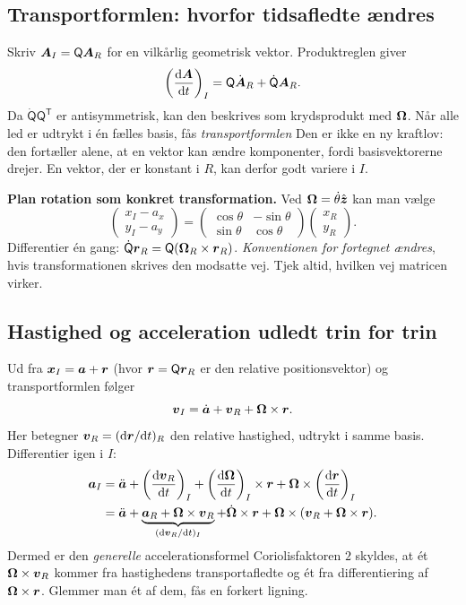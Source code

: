 \subsection{Transportformlen: hvorfor tidsafledte ændres}
Skriv $\boldsymbol{A}_I=\mathsf Q\boldsymbol{A}_R$ for en vilkårlig geometrisk vektor. Produktreglen giver
\[
\left(\frac{\mathrm d\boldsymbol{A}}{\mathrm d t}\right)_I
=\mathsf Q\dot{\boldsymbol{A}}_R+\dot{\mathsf Q}\boldsymbol{A}_R.
\]
Da $\dot{\mathsf Q}\mathsf Q^{\mathsf T}$ er antisymmetrisk, kan den beskrives som krydsprodukt med $\boldsymbol{\Omega}$. Når alle led er udtrykt i én fælles basis, fås \emph{transportformlen}
Den er ikke en ny kraftlov: den fortæller alene, at en vektor kan ændre komponenter, fordi basisvektorerne drejer. En vektor, der er konstant i $R$, kan derfor godt variere i $I$.

\textbf{Plan rotation som konkret transformation.} Ved $\boldsymbol{\Omega}=\dot\theta\hat{\boldsymbol{z}}$ kan man vælge
\[
\begin{pmatrix}x_I-a_x\\y_I-a_y\end{pmatrix}
=\begin{pmatrix}\cos\theta&-\sin\theta\\\sin\theta&\cos\theta\end{pmatrix}
\begin{pmatrix}x_R\\y_R\end{pmatrix}.
\]
Differentier én gang: $\dot{\mathsf Q}\boldsymbol{r}_R=\mathsf Q(\boldsymbol{\Omega}_R\times\boldsymbol{r}_R)$. \emph{Konventionen for fortegnet ændres}, hvis transformationen skrives den modsatte vej. Tjek altid, hvilken vej matricen virker.

\subsection{Hastighed og acceleration udledt trin for trin}
Ud fra $\boldsymbol{x}_I=\boldsymbol{a}+\boldsymbol{r}$ (hvor $\boldsymbol{r}=\mathsf Q\boldsymbol{r}_R$ er den relative positionsvektor) og transportformlen følger
\[
\boldsymbol{v}_I=\dot{\boldsymbol{a}}+\boldsymbol{v}_R+\boldsymbol{\Omega}\times\boldsymbol{r}.
\]
Her betegner $\boldsymbol{v}_R=(\mathrm d\boldsymbol{r}/\mathrm d t)_R$ den relative hastighed, udtrykt i samme basis. Differentier igen i $I$:
\begin{align*}
\boldsymbol{a}_I
&=\ddot{\boldsymbol{a}}
+\left(\frac{\mathrm d\boldsymbol{v}_R}{\mathrm d t}\right)_I
+\left(\frac{\mathrm d\boldsymbol{\Omega}}{\mathrm d t}\right)_I\times\boldsymbol{r}
+\boldsymbol{\Omega}\times\left(\frac{\mathrm d\boldsymbol{r}}{\mathrm d t}\right)_I\\
&=\ddot{\boldsymbol{a}}
+\underbrace{\boldsymbol{a}_R+\boldsymbol{\Omega}\times\boldsymbol{v}_R}_{(\mathrm d\boldsymbol{v}_R/\mathrm d t)_I}
+\dot{\boldsymbol{\Omega}}\times\boldsymbol{r}
+\boldsymbol{\Omega}\times(\boldsymbol{v}_R+\boldsymbol{\Omega}\times\boldsymbol{r}).
\end{align*}
Dermed er den \emph{generelle} accelerationsformel
Coriolisfaktoren $2$ skyldes, at ét $\boldsymbol{\Omega}\times\boldsymbol{v}_R$ kommer fra hastighedens transportafledte og ét fra differentiering af $\boldsymbol{\Omega}\times\boldsymbol{r}$. Glemmer man ét af dem, fås en forkert ligning.

